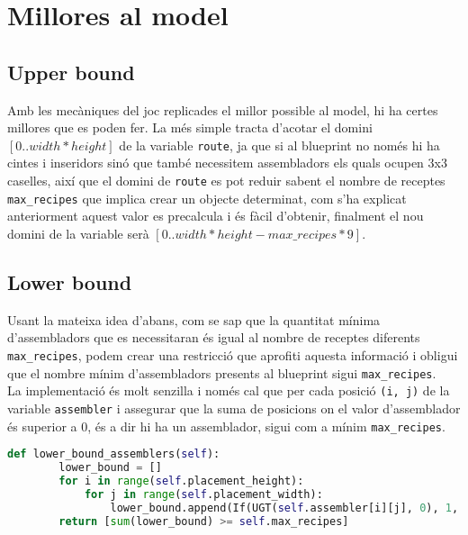 \section{Millores al model}
\subsection{Upper bound}\label{upper-bound}
Amb les mecàniques del joc replicades el millor possible al model, hi ha certes millores que es poden fer. La més simple tracta d'acotar el domini $[0..width * height]$ de la variable \lstinline{route}, ja que si al blueprint no només hi ha cintes i inseridors sinó que també necessitem assembladors els quals ocupen 3x3 caselles, així que el domini de \lstinline{route} es pot reduir sabent el nombre de receptes \lstinline{max_recipes} que implica crear un objecte determinat, com s'ha explicat anteriorment aquest valor es precalcula i és fàcil d'obtenir, finalment el nou domini de la variable serà $[0..width * height - max\_recipes * 9]$.

\subsection{Lower bound}\label{lower-bound}
Usant la mateixa idea d'abans, com se sap que la quantitat mínima d'assembladors que es necessitaran és igual al nombre de receptes diferents \lstinline{max_recipes}, podem crear una restricció que aprofiti aquesta informació i obligui que el nombre mínim d'assembladors presents al blueprint sigui \lstinline{max_recipes}.\\
La implementació és molt senzilla i només cal que per cada posició \lstinline{(i, j)} de la variable \lstinline{assembler} i assegurar que la suma de posicions on el valor d'assemblador és superior a 0, és a dir hi ha un assemblador, sigui com a mínim \lstinline{max_recipes}.

\begin{lstlisting}[language=Python, caption=Lower Bound]
    def lower_bound_assemblers(self):
        lower_bound = []
        for i in range(self.placement_height):
            for j in range(self.placement_width):
                lower_bound.append(If(UGT(self.assembler[i][j], 0), 1, 0))
        return [sum(lower_bound) >= self.max_recipes]
\end{lstlisting}

